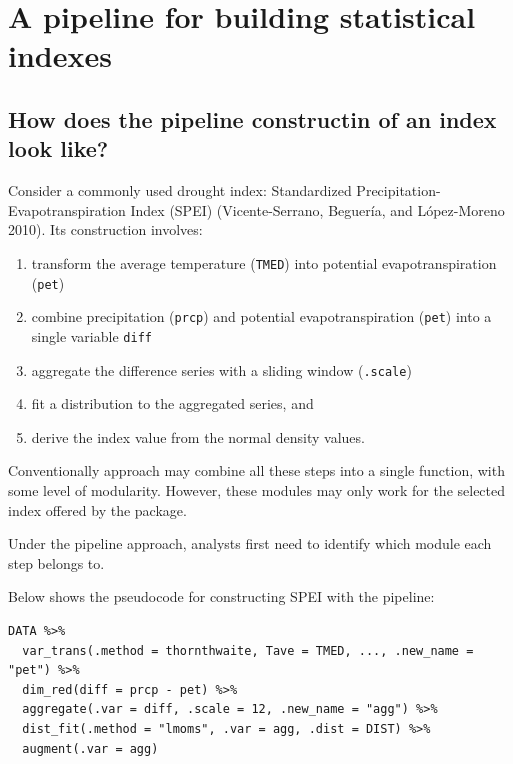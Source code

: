 \documentclass[
]{interact}
\providecommand{\tightlist}{%
  \setlength{\itemsep}{0pt}\setlength{\parskip}{0pt}}\usepackage{longtable,booktabs,array}
\begin{document}
\hypertarget{sec-index-pipeline}{%
\section{A pipeline for building statistical
indexes}\label{sec-index-pipeline}}

\hypertarget{sec-toy-example}{%
\subsection{How does the pipeline constructin of an index look
like?}\label{sec-toy-example}}

Consider a commonly used drought index: Standardized
Precipitation-Evapotranspiration Index (SPEI) (Vicente-Serrano,
Beguería, and López-Moreno 2010). Its construction involves:

\begin{enumerate}
\def\labelenumi{\arabic{enumi})}
\tightlist
\item
  transform the average temperature (\texttt{TMED}) into potential
  evapotranspiration (\texttt{pet})
\item
  combine precipitation (\texttt{prcp}) and potential evapotranspiration
  (\texttt{pet}) into a single variable \texttt{diff}
\item
  aggregate the difference series with a sliding window
  (\texttt{.scale})
\item
  fit a distribution to the aggregated series, and
\item
  derive the index value from the normal density values.
\end{enumerate}

Conventionally approach may combine all these steps into a single
function, with some level of modularity. However, these modules may only
work for the selected index offered by the package.

Under the pipeline approach, analysts first need to identify which
module each step belongs to.

Below shows the pseudocode for constructing SPEI with the pipeline:

\begin{verbatim}
DATA %>% 
  var_trans(.method = thornthwaite, Tave = TMED, ..., .new_name = "pet") %>%
  dim_red(diff = prcp - pet) %>%
  aggregate(.var = diff, .scale = 12, .new_name = "agg") %>%
  dist_fit(.method = "lmoms", .var = agg, .dist = DIST) %>%
  augment(.var = agg)
\end{verbatim}
\end{document}
